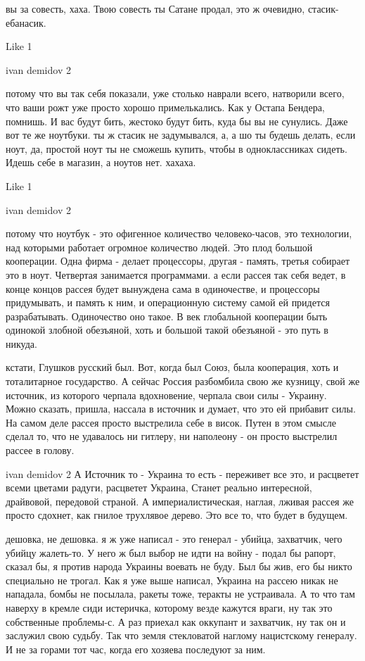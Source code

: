 вы за совесть, хаха. Твою совесть ты Сатане продал, это ж очевидно,
стасик-ебанасик.

    Like 1

ivan demidov 2

потому что вы так себя показали, уже столько наврали всего, натворили всего,
что ваши рожт уже просто хорошо примелькались. Как у Остапа Бендера, помнишь. И
вас будут бить, жестоко будут бить, куда бы вы не сунулись. Даже вот те же
ноутбуки. ты ж стасик не задумывался, а, а шо ты будешь делать, если ноут, да,
простой ноут ты не сможешь купить, чтобы в одноклассниках сидеть. Идешь себе в
магазин, а ноутов нет. хахаха.

    Like 1

ivan demidov 2

потому что ноутбук - это офигенное количество человеко-часов, это технологии,
над которыми работает огромное количество людей. Это плод большой кооперации.
Одна фирма - делает процессоры, другая - память, третья собирает это в ноут.
Четвертая занимается программами. а если рассея так себя ведет, в конце концов
рассея будет вынуждена сама в одиночестве, и процессоры придумывать, и память к
ним, и операционную систему самой ей придется разрабатывать. Одиночество оно
такое. В век глобальной кооперации быть одинокой злобной обезъяной, хоть и
большой такой обезъяной - это путь в никуда.

кстати, Глушков русский был. Вот, когда был Союз, была кооперация, хоть и
тоталитарное государство. А сейчас Россия разбомбила свою же кузницу, свой же
источник, из которого черпала вдохновение, черпала свои силы - Украину. Можно
сказать, пришла, нассала в источник и думает, что это ей прибавит силы. На
самом деле рассея просто выстрелила себе в висок. Путен в этом смысле сделал
то, что не удавалось ни гитлеру, ни наполеону - он просто выстрелил рассее в
голову.

ivan demidov 2 А Источник то - Украина то есть - переживет все это, и расцветет
всеми цветами радуги, расцветет Украина, Станет реально интересной, драйвовой,
передовой страной. А империалистическая, наглая, лживая рассея же просто
сдохнет, как гнилое трухлявое дерево. Это все то, что будет в будущем.

дешовка, не дешовка. я ж уже написал - это генерал - убийца, захватчик, чего
убийцу жалеть-то. У него ж был выбор не идти на войну - подал бы рапорт, сказал
бы, я против народа Украины воевать не буду. Был бы жив, его бы никто
специально не трогал. Как я уже выше написал, Украина на рассею никак не
нападала, бомбы не посылала, ракеты тоже, теракты не устраивала. А то что там
наверху в кремле сиди истеричка, которому везде кажутся враги, ну так это
собственные проблемы-с. А раз приехал как оккупант и захватчик, ну так он и
заслужил свою судьбу. Так что земля стекловатой наглому нацистскому генералу. И
не за горами тот час, когда его хозяева последуют за ним.

